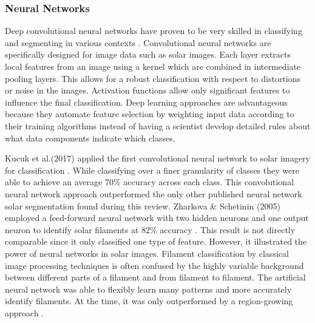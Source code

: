 \documentclass[twoside]{report}
\begin{document}
\subsubsection{Neural Networks}
Deep convolutional neural networks have proven to be very skilled in classifying and segmenting in various contexts \cite{szegedy:2015, tso:2009, krizhevsky:2012}. Convolutional neural networks are specifically designed for image data such as solar images. Each layer extracts local features from an image using a kernel which are combined in intermediate pooling layers. This allows for a robust classification with respect to distortions or noise in the images. Activation functions allow only significant features to influence the final classification. Deep learning approaches are advantageous because they automate feature selection by weighting input data according to their training algorithms instead of having a scientist develop detailed rules about what data components indicate which classes.

Kucuk et al.(2017) applied the first convolutional neural network to solar imagery for classification \cite{kucuk:2017}. While classifying over a finer granularity of classes they were able to achieve an average 70\% accuracy across each class. This convolutional neural network approach outperformed the only other published neural network solar segmentation found during this review. Zharkova \& Schetinin (2005) employed a feed-forward neural network with two hidden neurons and one output neuron to identify solar filaments at 82\% accuracy \cite{zharkova:2005}. This result is not directly comparable since it only classified one type of feature. However, it illustrated the power of neural networks in solar images. Filament classification by classical image processing techniques is often confused by the highly variable background between different parts of a filament and from filament to filament. The artificial neural network was able to flexibly learn many patterns and more accurately identify filaments. At the time, it was only outperformed by a region-growing approach \cite{fuller:2005}. 
\end{document}
